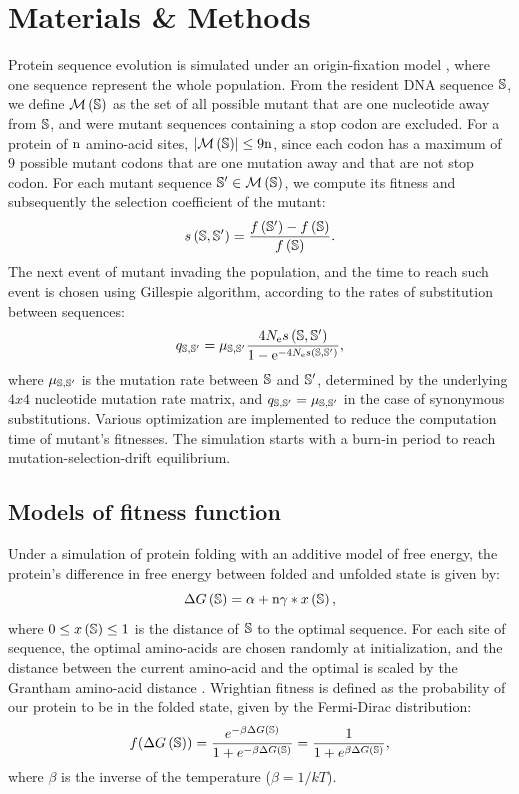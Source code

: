 \documentclass{article}
\begin{document}
	\section*{Materials \& Methods}
	Protein sequence evolution is simulated under an origin-fixation model \cite{McCandlish2014}, where one sequence represent the whole population.
	From the resident DNA sequence $\mathbb{S}$, we define $\mathcal{M}\left(\mathbb{S}\right)$ as the set of all possible mutant that are one nucleotide away from $\mathbb{S}$, and were mutant sequences containing a stop codon are excluded.
	For a protein of $\text{n}$ amino-acid sites, $\left| \mathcal{M}\left(\mathbb{S}\right) \right| \leq 9 \text{n}$, since each codon has a maximum of $9$ possible mutant codons that are one mutation away and that are not stop codon.
	For each mutant sequence $\mathbb{S}' \in \mathcal{M}\left(\mathbb{S}\right)$, we compute its fitness and subsequently the selection coefficient of the mutant:
	\begin{equation}
	s \left( \mathbb{S},\mathbb{S}'\right) = \dfrac{ f \left(\mathbb{S}' \right) - f \left(\mathbb{S}\right) }{f\left( \mathbb{S} \right)}.
	\end{equation}
	The next event of mutant invading the population, and the time to reach such event is chosen using Gillespie algorithm, according to the rates of substitution between sequences:
	\begin{equation}
	q_{\mathbb{S}, \mathbb{S}'} = \mu_{\mathbb{S}, \mathbb{S}'} \dfrac{4 N_{\mathrm{e}} s \left( \mathbb{S},\mathbb{S}'\right)}{1 - \mathrm{e}^{-4 N_{\mathrm{e}} s \left( \mathbb{S},\mathbb{S}'\right)}}, 
	\end{equation}
	where $\mu_{\mathbb{S}, \mathbb{S}'}$ is the mutation rate between $\mathbb{S}$ and $\mathbb{S}'$, determined by the underlying $4x4$ nucleotide mutation rate matrix, and ${q_{\mathbb{S}, \mathbb{S}'}} = \mu_{\mathbb{S}, \mathbb{S}'}$ in the case of synonymous substitutions.
	Various optimization are implemented to reduce the computation time of mutant's fitnesses.
	The simulation starts with a burn-in period to reach mutation-selection-drift equilibrium.
	\subsection*{Models of fitness function}
	\label{MatMet:folding}
	Under a simulation of protein folding with an additive model of free energy, the protein's difference in free energy between folded and unfolded state is given by:
	\begin{equation*}
	\Delta G\left(\mathbb{S}\right) = \alpha + \text{n} \gamma * x\left(\mathbb{S}\right), 
	\end{equation*}
	where $0 \leq x\left(\mathbb{S}\right) \leq 1$ is the distance of $\mathbb{S}$ to the optimal sequence.
	For each site of sequence, the optimal amino-acids are chosen randomly at initialization, and the distance between the current amino-acid and the optimal is scaled by the Grantham amino-acid distance \cite{Grantham1974}.
	Wrightian fitness is defined as the probability of our protein to be in the folded state, given by the Fermi-Dirac distribution: 
	\begin{equation}
	f(\Delta G\left(\mathbb{S}\right)) = \dfrac{e^{-\beta \Delta G\left(\mathbb{S}\right) }}{1 + e^{-\beta \Delta G\left(\mathbb{S}\right) }} = \dfrac{1}{1 + e^{\beta \Delta G\left(\mathbb{S}\right) }}, 
	\end{equation}
	where $\beta$ is the inverse of the temperature ($\beta=1/kT$).\\
	
\end{document}
